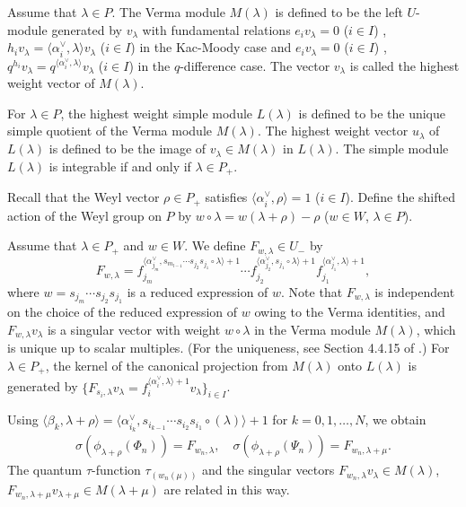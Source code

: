 \documentclass[12pt,twoside]{article}
\newcommand\bra{\langle}
\newcommand\ket{\rangle}
\newcommand\av{\alpha^\vee}
\theoremstyle{plain} %
\theoremstyle{definition} %
\theoremstyle{definition} %
\numberwithin{theorem}{section}
\numberwithin{equation}{section}
\numberwithin{figure}{section}
\numberwithin{table}{section}
\begin{document}
Assume that $\lambda\in P$.
The Verma module $M(\lambda)$ is defined to be the left $U$-module 
generated by $v_\lambda$ with fundamental relations
$e_iv_\lambda=0$ ($i\in I$) , 
$h_iv_\lambda=\bra\av_i,\lambda\ket v_\lambda$ ($i\in I$)
in the Kac-Moody case and
$e_iv_\lambda=0$ ($i\in I$) , 
$q^{h_i}v_\lambda=q^{\bra\av_i,\lambda\ket}v_\lambda$ ($i\in I$)
in the $q$-difference case.
The vector $v_\lambda$ is called the highest weight vector of $M(\lambda)$.

For $\lambda\in P$, 
the highest weight simple module $L(\lambda)$ is defined to be
the unique simple quotient of the Verma module $M(\lambda)$.
The highest weight vector $u_\lambda$ of $L(\lambda)$
is defined to be the image of $v_\lambda\in M(\lambda)$ in $L(\lambda)$.
The simple module $L(\lambda)$ is integrable if and only if $\lambda\in P_+$.

Recall that the Weyl vector $\rho\in P_+$ satisfies $\bra\av_i,\rho\ket=1$ ($i\in I$).
Define the shifted action of the Weyl group on $P$ by
$w\circ\lambda = w(\lambda+\rho)-\rho$ ($w\in W$, $\lambda\in P$).

Assume that $\lambda\in P_+$ and $w\in W$.
We define $F_{w,\lambda}\in U_-$ by
\begin{equation*}
 F_{w,\lambda}
 =
 f_{j_m}^{\bra\av_{j_m},s_{m_{l-1}}\cdots s_{j_2}s_{j_1}\circ\lambda\ket+1}
 \cdots
 f_{j_2}^{\bra\av_{j_2},s_{j_1}\circ\lambda\ket+1}
 f_{j_1}^{\bra\av_{j_1},\lambda\ket+1},
\end{equation*}
where $w=s_{j_m}\cdots s_{j_2}s_{j_1}$ is a reduced expression of $w$.
Note that $F_{w,\lambda}$ is independent on the choice of the reduced
expression of $w$ owing to the Verma identities, 
and $F_{w,\lambda}v_\lambda$ is a singular vector 
with weight $w\circ\lambda$ in the Verma module $M(\lambda)$,
which is unique up to scalar multiples.
(For the uniqueness, see Section 4.4.15 of \cite{Jos-1995}.)
For $\lambda\in P_+$, 
the kernel of the canonical projection from $M(\lambda)$ onto $L(\lambda)$
is generated by \(
 \{F_{s_i,\lambda}v_\lambda=f_i^{\bra\av_i,\lambda\ket+1}v_\lambda\}_{i\in I}
\).

Using 
\(
 \bra\beta_k,\lambda+\rho\ket
 = \bra\av_{i_k},s_{i_{k-1}}\cdots s_{i_2}s_{i_1}\circ(\lambda)\ket+1
\) for $k=0,1,\ldots,N$, we obtain
\begin{align*}
 \sigma(\phi_{\lambda+\rho}(\Phi_n)) = F_{w_n,\lambda},
 \quad
 \sigma(\phi_{\lambda+\rho}(\Psi_n)) = F_{w_n,\lambda+\mu}.
\end{align*}
The quantum $\tau$-function $\tau_{(w_n(\mu))}$ 
and the singular vectors 
$F_{w_n,\lambda}v_\lambda\in M(\lambda)$, 
$F_{w_n,\lambda+\mu}v_{\lambda+\mu}\in M(\lambda+\mu)$
are related in this way.
\end{document}
